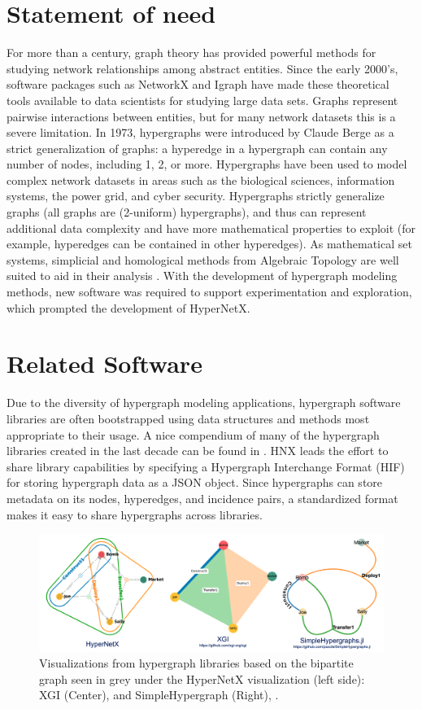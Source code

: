\documentclass{article}
\begin{document}
\section{Statement of need}
For more than a century, graph theory has provided powerful methods for studying network relationships among abstract entities.
Since the early 2000's, software packages such as NetworkX \cite{hagberg2020}and Igraph \cite{csardi2006} have
made these theoretical tools available to data scientists for studying large data sets.
Graphs represent pairwise interactions between entities, but for many network datasets this is a severe limitation.
In 1973, hypergraphs were introduced by Claude Berge \cite{Berge1973Graphs}as a strict generalization of graphs: a hyperedge in a hypergraph can contain any number of nodes, including 1, 2, or more.
Hypergraphs have been used to model complex network datasets in
areas such as the biological sciences, information systems, the power grid, and cyber security.
Hypergraphs strictly generalize graphs (all graphs are (2-uniform) hypergraphs), and thus can represent additional data complexity and have more mathematical properties to exploit (for example, hyperedges can be contained in other hyperedges). As mathematical set systems, simplicial and homological methods from
Algebraic Topology are well suited to aid in their analysis \cite{Joslyn2021,Torres2021}.
With the development of hypergraph modeling methods, new software was required to support
experimentation and exploration, which prompted the development of HyperNetX.

\section{Related Software}
Due to the diversity of hypergraph modeling applications, hypergraph software libraries are
often bootstrapped using data structures and methods most appropriate to their usage.
A nice compendium of many of the hypergraph libraries created in the last decade can be found in \cite{Kurte2021}.
HNX leads the effort to share library capabilities by specifying a Hypergraph Interchange Format (HIF)
for storing hypergraph data as a JSON object. Since hypergraphs can store metadata on its nodes,
hyperedges, and incidence pairs, a standardized format makes it easy to share hypergraphs across libraries.

\begin{figure}[h!]
    \centering
    \includegraphics[]{Figures/3graphs.png}
    \caption{Visualizations from hypergraph libraries based on the bipartite graph seen in grey
    under the HyperNetX visualization (left side): XGI (Center), \cite{Landry2023} and SimpleHypergraph (Right), \cite{Szufel2019}.}
    \label{fig:3graphs}
    \end{figure}
\end{document}

